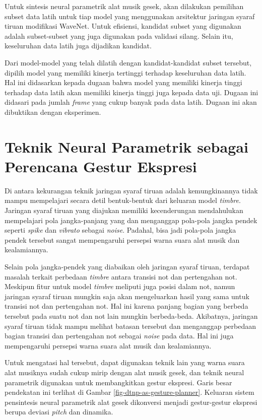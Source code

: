 Untuk sintesis neural parametrik alat musik gesek, akan dilakukan pemilihan subset data latih untuk tiap model yang menggunakan arsitektur jaringan syaraf tiruan modifikasi WaveNet. Untuk efisiensi, kandidat subset yang digunakan adalah subset-subset yang juga digunakan pada validasi silang. Selain itu, keseluruhan data latih juga dijadikan kandidat.

Dari model-model yang telah dilatih dengan kandidat-kandidat subset tersebut, dipilih model yang memiliki kinerja tertinggi terhadap keseluruhan data latih. Hal ini didasarkan kepada dugaan bahwa model yang memiliki kinerja tinggi terhadap data latih akan memiliki kinerja tinggi juga kepada data uji. Dugaan ini didasari pada jumlah \textit{frame} yang cukup banyak pada data latih. Dugaan ini akan dibuktikan dengan eksperimen.

\section{Teknik Neural Parametrik sebagai Perencana Gestur Ekspresi}

Di antara kekurangan teknik jaringan syaraf tiruan adalah kemungkinannya tidak mampu mempelajari secara detil bentuk-bentuk dari keluaran model \textit{timbre}. Jaringan syaraf tiruan yang diajukan memiliki kecenderungan mendahulukan mempelajari pola jangka-panjang yang dan menganggap pola-pola jangka pendek seperti \textit{spike} dan \textit{vibrato} sebagai \textit{noise}. Padahal, bisa jadi pola-pola jangka pendek tersebut sangat mempengaruhi persepsi warna suara alat musik dan kealamiannya.

Selain pola jangka-pendek yang diabaikan oleh jaringan syaraf tiruan, terdapat masalah terkait perbedaan \textit{timbre} antara transisi not dan pertengahan not. Meskipun fitur untuk model \textit{timbre} meliputi juga posisi dalam not, namun jaringan syaraf tiruan mungkin saja akan mengeluarkan hasil yang sama untuk transisi not dan pertengahan not. Hal ini karena panjang bagian yang berbeda tersebut pada suatu not dan not lain mungkin berbeda-beda. Akibatnya, jaringan syaraf tiruan tidak mampu melihat batasan tersebut dan menganggap perbedaan bagian transisi dan pertengahan not sebagai \textit{noise} pada data. Hal ini juga mempengaruhi persepsi warna suara alat musik dan kealamiannya.

Untuk mengatasi hal tersebut, dapat digunakan teknik lain yang warna suara alat musiknya sudah cukup mirip dengan alat musik gesek, dan teknik neural parametrik digunakan untuk membangkitkan gestur ekspresi. Garis besar pendekatan ini terlihat di Gambar \ref{fig-dtnp-as-gesture-planner}. Keluaran sistem pensintesis neural parametrik alat gesek dikonversi menjadi gestur-gestur ekspresi berupa deviasi \textit{pitch} dan dinamika.

